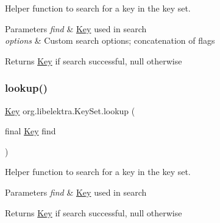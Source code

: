 Helper function to search for a key in the key set. 


\begin{DoxyParams}{Parameters}
{\em find} & \mbox{\hyperlink{classorg_1_1libelektra_1_1Key}{Key}} used in search \\
\hline
{\em options} & Custom search options; concatenation of flags \\
\hline
\end{DoxyParams}
\begin{DoxyReturn}{Returns}
\mbox{\hyperlink{classorg_1_1libelektra_1_1Key}{Key}} if search successful, null otherwise 
\end{DoxyReturn}
\mbox{\label{classorg_1_1libelektra_1_1KeySet_a9ff1d475fd6ae316515c4c1cc173991b}} 
\subsubsection{\texorpdfstring{lookup()}{lookup()}\hspace{0.1cm}{\footnotesize\ttfamily [2/4]}}
{\footnotesize\ttfamily \mbox{\hyperlink{classorg_1_1libelektra_1_1Key}{Key}} org.\+libelektra.\+Key\+Set.\+lookup (\begin{DoxyParamCaption}\item[{final \mbox{\hyperlink{classorg_1_1libelektra_1_1Key}{Key}}}]{find }\end{DoxyParamCaption})\hspace{0.3cm}{\ttfamily [inline]}}



Helper function to search for a key in the key set. 


\begin{DoxyParams}{Parameters}
{\em find} & \mbox{\hyperlink{classorg_1_1libelektra_1_1Key}{Key}} used in search \\
\hline
\end{DoxyParams}
\begin{DoxyReturn}{Returns}
\mbox{\hyperlink{classorg_1_1libelektra_1_1Key}{Key}} if search successful, null otherwise 
\end{DoxyReturn}
\mbox{\label{classorg_1_1libelektra_1_1KeySet_aa17a04907eb8c8d2a9a488788d0039ea}} 

